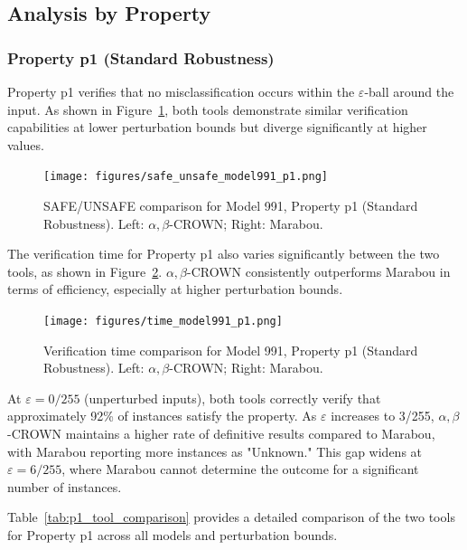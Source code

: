 

\subsection{Analysis by Property}

\subsubsection{Property p1 (Standard Robustness)}

Property p1 verifies that no misclassification occurs within the $\varepsilon$-ball around the input. As shown in Figure~\ref{fig:safe_unsafe_model991_p1}, both tools demonstrate similar verification capabilities at lower perturbation bounds but diverge significantly at higher values.

\begin{figure}[htbp]
    \centering
    \texttt{[image: figures/safe\_unsafe\_model991\_p1.png]}
    \caption{SAFE/UNSAFE comparison for Model 991, Property p1 (Standard Robustness). Left: $\alpha, \beta$-CROWN; Right: Marabou.}
    \label{fig:safe_unsafe_model991_p1}
\end{figure}

The verification time for Property p1 also varies significantly between the two tools, as shown in Figure~\ref{fig:time_model991_p1}. $\alpha, \beta$-CROWN consistently outperforms Marabou in terms of efficiency, especially at higher perturbation bounds.

\begin{figure}[htbp]
    \centering
    \texttt{[image: figures/time\_model991\_p1.png]}
    \caption{Verification time comparison for Model 991, Property p1 (Standard Robustness). Left: $\alpha, \beta$-CROWN; Right: Marabou.}
    \label{fig:time_model991_p1}
\end{figure}

At $\varepsilon = 0/255$ (unperturbed inputs), both tools correctly verify that approximately 92\% of instances satisfy the property. As $\varepsilon$ increases to 3/255, $\alpha, \beta$-CROWN maintains a higher rate of definitive results compared to Marabou, with Marabou reporting more instances as "Unknown." This gap widens at $\varepsilon = 6/255$, where Marabou cannot determine the outcome for a significant number of instances.

Table~\ref{tab:p1_tool_comparison} provides a detailed comparison of the two tools for Property p1 across all models and perturbation bounds.

